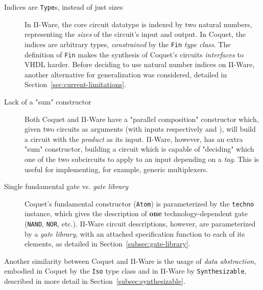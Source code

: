             \begin{description}
                \item[Indices are \texttt{Type}s, instead of just sizes]
                    In Π-Ware, the core circuit datatype is indexed by two natural numbers,
                    representing the \emph{sizes} of the circuit's input and output.
                    In Coquet, the indices are arbitrary types, \emph{constrained} by the
                    \texttt{Fin} \emph{type class}.
                    The definition of \texttt{Fin} makes the synthesis of Coquet's circuits
                    \emph{interfaces} to \ac{VHDL} harder.
                    Before deciding to use natural number indices on Π-Ware, another alternative
                    for generalization was considered, detailed in Section~\ref{sec:current-limitations}.

                \item[Lack of a "sum" constructor]
                    Both Coquet and Π-Ware have a "parallel composition" constructor
                    which, given two circuits as arguments (with inputs respectively  and ),
                    will build a circuit with the \emph{product}    as its input.
                    Π-Ware, however, has an extra "sum" constructor, building a circuit which is capable
                    of "deciding" which one of the two subcircuits to apply to an input depending on a \emph{tag}.
                    This is useful for implementing, for example, generic multiplexers.

                \item[Single fundamental gate vs. \emph{gate library}]
                    Coquet's fundamental constructor (\texttt{Atom}) is parameterized
                    by the \texttt{techno} instance, which gives the description of \textbf{one}
                    technology-dependent gate (\texttt{NAND}, \texttt{NOR}, etc.).
                    Π-Ware circuit descriptions, however, are parameterized by a \emph{gate library},
                    with an attached specification function to each of its elements,
                    as detailed in Section~\ref{subsec:gate-library}.
            \end{description}

            Another similarity between Coquet and Π-Ware is the usage of \emph{data abstraction},
            embodied in Coquet by the \texttt{Iso} type class and in Π-Ware by \texttt{Synthesizable},
            described in more detail in Section~\ref{subsec:synthesizable}.


